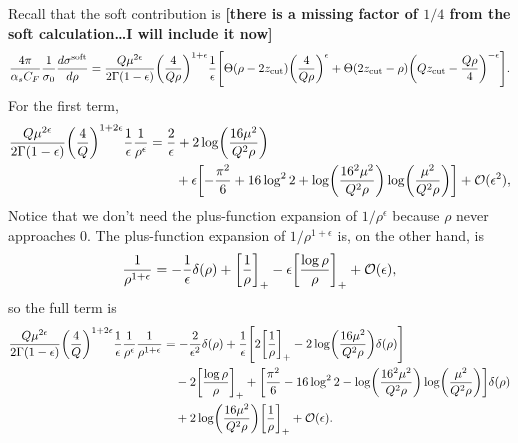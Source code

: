 \documentclass[11pt,twoside,reqno]{amsart}
\theoremstyle{plain}
\theoremstyle{remark}
\theoremstyle{definition}
\theoremstyle{remark}
\theoremstyle{definition}
\theoremstyle{definition}
\newcommand{\cO}{\mathcal{O}}
\newcommand{\zcut}{z_\mathrm{cut}}
\begin{document}
	Recall that the soft contribution is {\color{red}\textbf{[there is a missing factor of $1/4$ from the soft calculation\dots I will include it now]}}
	\begin{equation}
	\begin{aligned}
		\frac{4\pi}{\alpha_s C_F}\frac{1}{\sigma_0} \frac{d\sigma^{\text{soft}}}{d\rho} = 
		\frac{Q \mu^{2\epsilon}}{2\Gamma(1 - \epsilon)} \qty(\frac{4}{Q \rho})^{1 + \epsilon} \frac{1}{\epsilon} \qty[ \Theta(\rho - 2\zcut) \qty(\frac{4}{Q\rho})^\epsilon + \Theta(2\zcut - \rho) \qty(Q\zcut - \frac{Q\rho}{4})^{-\epsilon} ].
	\end{aligned}
	\end{equation}
	For the first term,
	\begin{equation}
	\begin{aligned}
		\frac{Q \mu^{2\epsilon}}{2\Gamma(1 - \epsilon)} \qty(\frac{4}{Q})^{1 + 2\epsilon} \frac{1}{\epsilon} \frac{1}{\rho^\epsilon} &= \frac{2}{\epsilon} + 2\log(\frac{16\mu^2}{Q^2\rho}) \\
		&\qquad+ \epsilon\qty[-\frac{\pi^2}{6} + 16 \log^2 2 + \log(\frac{16^2 \mu^2}{Q^2 \rho})\log(\frac{\mu^2}{Q^2\rho})] + \cO(\epsilon^2),
	\end{aligned}
	\end{equation}
	Notice that we don't need the plus-function expansion of $1/\rho^\epsilon$ because $\rho$ never approaches $0$. The plus-function expansion of $1/\rho^{1+\epsilon}$ is, on the other hand, is
	\begin{equation}
		\frac{1}{\rho^{1+\epsilon}} = -\frac{1}{\epsilon}\delta(\rho) + \qty[\frac{1}{\rho}]_+ - \epsilon\qty[\frac{\log\rho}{\rho}]_+ + \cO(\epsilon),
	\end{equation}
	so the full term is
	\begin{equation}
	\begin{aligned}
		\frac{Q \mu^{2\epsilon}}{2\Gamma(1 - \epsilon)} \qty(\frac{4}{Q})^{1 + 2\epsilon} \frac{1}{\epsilon} \frac{1}{\rho^\epsilon}\frac{1}{\rho^{1+\epsilon}} &= -\frac{2}{\epsilon^2}\delta(\rho) + \frac{1}{\epsilon}\qty[2\qty[\frac{1}{\rho}]_+ - 2\log(\frac{16\mu^2}{Q^2\rho})\delta(\rho)] \\
			&\quad -2\qty[\frac{\log\rho}{\rho}]_+ + \qty[\frac{\pi^2}{6} - 16 \log^2 2 - \log(\frac{16^2\mu^2}{Q^2\rho})\log(\frac{\mu^2}{Q^2\rho})]\delta(\rho) \\
			&\quad+ 2\log(\frac{16\mu^2}{Q^2\rho})\qty[\frac{1}{\rho}]_+ + \cO(\epsilon).
	\end{aligned}
	\end{equation}
\end{document}
